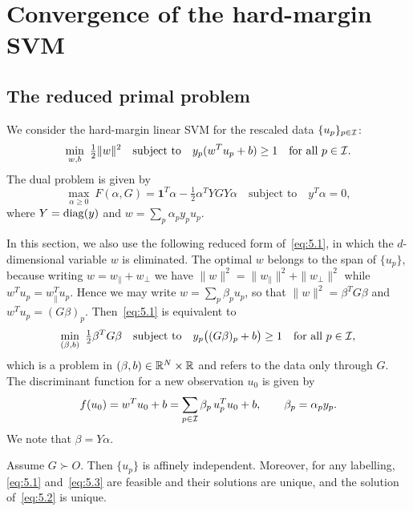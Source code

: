 \section{Convergence of the hard-margin SVM}
\label{sec:svm}

\subsection{The reduced primal problem}

We consider the hard-margin linear SVM for the rescaled data $\{u_p\}_{p\in\mathcal{I}}$:
\begin{equation}
\min_{w,b}\ \tfrac12\|w\|^2
\quad\text{subject to}\quad
y_p(w^Tu_p+b)\ge 1\quad\text{for all }p\in\mathcal{I}.
\label{eq:5.1}
\end{equation}
The dual problem is given by
\begin{equation}
\max_{\alpha\ge 0}\ F(\alpha,G)=\mathbf{1}^T\alpha-\tfrac12\alpha^TYGY\alpha
\quad\text{subject to}\quad y^T\alpha=0,
\label{eq:5.2}
\end{equation}
where $Y=\operatorname{diag}(y)$ and $w=\sum_p\alpha_p y_p u_p$.

In this section, we also use the following reduced form of~\eqref{eq:5.1}, in which
the $d$-dimensional variable $w$ is eliminated. The optimal $w$ belongs to the
span of $\{u_p\}$, because writing $w=w_\parallel+w_\perp$ we have
$\|w\|^2=\|w_\parallel\|^2+\|w_\perp\|^2$ while $w^Tu_p=w_\parallel^Tu_p$. Hence we
may write $w=\sum_p\beta_p u_p$, so that $\|w\|^2=\beta^TG\beta$ and
$w^Tu_p=(G\beta)_p$. Then~\eqref{eq:5.1} is equivalent to
\begin{equation}
\min_{(\beta,b)}\ \tfrac12\beta^TG\beta
\quad\text{subject to}\quad
y_p\bigl((G\beta)_p+b\bigr)\ge 1\quad\text{for all }p\in\mathcal{I},
\label{eq:5.3}
\end{equation}
which is a problem in $(\beta,b)\in\mathbb{R}^N\times\mathbb{R}$ and refers to the data only
through $G$. The discriminant function for a new observation $u_0$ is given by
\begin{equation}
f(u_0)=w^Tu_0+b=\sum_{p\in\mathcal{I}}\beta_p\,u_p^Tu_0+b,
\qquad\beta_p=\alpha_p y_p.
\label{eq:5.4}
\end{equation}
We note that $\beta=Y\alpha$.

\begin{lemma}
\label{lem:4}
Assume $G\succ O$. Then $\{u_p\}$ is affinely independent. Moreover, for any
labelling, \eqref{eq:5.1} and~\eqref{eq:5.3} are feasible and their solutions are
unique, and the solution of~\eqref{eq:5.2} is unique.
\end{lemma}

